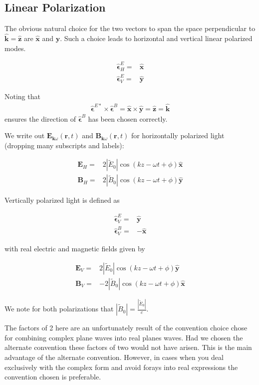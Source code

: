 \documentclass[12pt]{article}
\newcommand{\ep}{\epsilon}
\renewcommand{\vec}[1]{\boldsymbol{#1}}
\newcommand{\unitvec}[1]{\hat{\boldsymbol{#1}}}
\begin{document}
\subsection{Linear Polarization}
 
The obvious natural choice for the two vectors to span the space perpendicular to $\unitvec{k}=\unitvec{z}$ are $\unitvec{x}$ and $\unitvec{y}$.
Such a choice leads to horizontal and vertical linear polarized modes.

\begin{align}
\unitvec{\ep}^E_H =& \unitvec{x}\\
\unitvec{\ep}^E_V =& \unitvec{y}
\end{align}


Noting that 
\begin{align}
\unitvec{\ep}^{E*}\times\unitvec{\ep}^B = \unitvec{x}\times \unitvec{y} = \unitvec{z} = \unitvec{k}
\end{align}
ensures the direction of $\unitvec{\ep}^B$ has been chosen correctly.

We write out $\vec{E}_{\vec{k}\omega}(\vec{r}, t)$ and $\vec{B}_{\vec{k}\omega}(\vec{r}, t)$ for horizontally polarized light (dropping many subscripts and labels):

\begin{align}
\vec{E}_H =& 2 |\tilde{E}_0| \cos\left(k z - \omega t + \phi\right) \unitvec{x}\\
\vec{B}_H =& 2 |\tilde{B}_0| \cos\left(k z - \omega t + \phi\right) \unitvec{y}
\end{align}


Vertically polarized light is defined as

\begin{align}
\unitvec{\ep}^E_V =& \unitvec{y}\\
\unitvec{\ep}^B_V =& -\unitvec{x}
\end{align}

with real electric and magnetic fields given by

\begin{align}
\vec{E}_V =& 2 |\tilde{E}_0| \cos\left(k z - \omega t + \phi\right) \unitvec{y}\\
\vec{B}_V =& -2 |\tilde{B}_0| \cos\left(k z - \omega t + \phi\right) \unitvec{x}
\end{align}

We note for both polarizations that $|\tilde{B}_0| = \frac{|\tilde{E}_0|}{c}$.

The factors of 2 here are an unfortunately result of the convention choice chose for combining complex plane waves into real planes waves.
Had we chosen the alternate convention these factors of two would not have arisen.
This is the main advantage of the alternate convention.
However, in cases when you deal exclusively with the complex form and avoid forays into real expressions the convention chosen is preferable.
\end{document}
